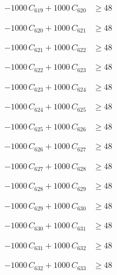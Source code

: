 \documentclass[a4paper,11pt]{article}
\begin{document}
\begin{align}
-1000\,C_{619} + 1000\,C_{620} &\geq 48 \nonumber
\end{align}

\begin{align}
-1000\,C_{620} + 1000\,C_{621} &\geq 48 \nonumber
\end{align}

\begin{align}
-1000\,C_{621} + 1000\,C_{622} &\geq 48 \nonumber
\end{align}

\begin{align}
-1000\,C_{622} + 1000\,C_{623} &\geq 48 \nonumber
\end{align}

\begin{align}
-1000\,C_{623} + 1000\,C_{624} &\geq 48 \nonumber
\end{align}

\begin{align}
-1000\,C_{624} + 1000\,C_{625} &\geq 48 \nonumber
\end{align}

\begin{align}
-1000\,C_{625} + 1000\,C_{626} &\geq 48 \nonumber
\end{align}

\begin{align}
-1000\,C_{626} + 1000\,C_{627} &\geq 48 \nonumber
\end{align}

\begin{align}
-1000\,C_{627} + 1000\,C_{628} &\geq 48 \nonumber
\end{align}

\begin{align}
-1000\,C_{628} + 1000\,C_{629} &\geq 48 \nonumber
\end{align}

\begin{align}
-1000\,C_{629} + 1000\,C_{630} &\geq 48 \nonumber
\end{align}

\begin{align}
-1000\,C_{630} + 1000\,C_{631} &\geq 48 \nonumber
\end{align}

\begin{align}
-1000\,C_{631} + 1000\,C_{632} &\geq 48 \nonumber
\end{align}

\begin{align}
-1000\,C_{632} + 1000\,C_{633} &\geq 48 \nonumber
\end{align}
\end{document}
